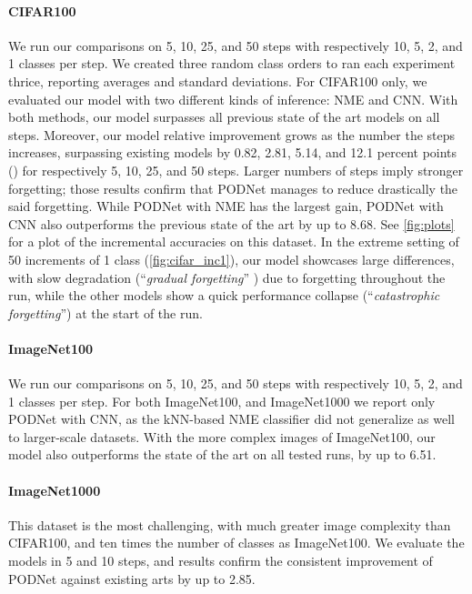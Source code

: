 \paragraph{CIFAR100} We run our comparisons on 5, 10, 25, and 50 steps with respectively 10, 5, 2,
and 1 classes per step. We created three random class orders to ran each experiment thrice,
reporting averages and standard deviations. For CIFAR100 only, we evaluated our model with two
different kinds of inference: NME and CNN. With both methods, our model surpasses all previous state
of the art models on all steps. Moreover, our model relative improvement grows as the number the
steps increases, surpassing existing models by 0.82, 2.81, 5.14, and 12.1 percent points (\pp) for
respectively 5, 10, 25, and 50 steps. Larger numbers of steps imply  stronger forgetting; those
results confirm that PODNet manages to reduce drastically the said forgetting. While PODNet with NME
has the largest gain, PODNet with CNN also outperforms the previous state of the art by up to
8.68\pp. See \autoref{fig:plots} for a plot of the incremental accuracies on this dataset. In the
extreme setting of 50 increments of 1 class (\autoref{fig:cifar_inc1}), our model showcases large
differences, with slow degradation (``\textit{gradual forgetting}''
\citep{french1999catastrophicforgetting}) due to forgetting throughout the run, while the other
models show a quick performance collapse (``\textit{catastrophic forgetting}'') at the start of the
run.

\paragraph{ImageNet100} We run our comparisons on 5, 10, 25, and 50 steps with respectively 10, 5,
2, and 1 classes per step. For both ImageNet100, and ImageNet1000 we report only PODNet with CNN, as
the kNN-based NME classifier did not generalize as well to larger-scale datasets. With the more
complex images of ImageNet100, our model also outperforms the state of the art on all tested runs,
by up to 6.51\pp.

\paragraph{ImageNet1000} This dataset is the most challenging, with much greater image complexity
than CIFAR100, and ten times the number of classes as ImageNet100. We evaluate the models in 5 and
10 steps, and results confirm the consistent improvement of PODNet against existing arts by up to
2.85\pp.

